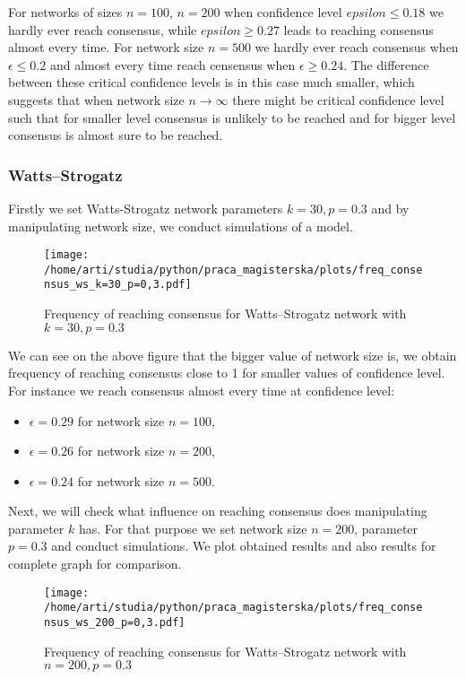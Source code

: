 \documentclass{article}
\begin{document}
For networks of sizes $n=100$, $n=200$ when confidence level $epsilon\leq0.18$ we hardly ever reach consensus, while $epsilon\geq0.27$ leads to reaching consensus almost every time.
For network size $n=500$ we hardly ever reach consensus when $\epsilon\leq0.2$ and almost every time reach censensus when $\epsilon\geq0.24$. The difference between these critical confidence levels is in this case much smaller, which suggests that when network size $n \to \infty$ there might be critical confidence level such that for smaller level consensus is unlikely to be reached and for bigger level consensus is almost sure to be reached. 

\subsubsection{Watts--Strogatz}

Firstly we set Watts-Strogatz network parameters $k=30, p=0.3$ and by manipulating network size, we conduct simulations of a model.

\begin{figure}[H]
		\centering
		\texttt{[image: /home/arti/studia/python/praca\_magisterska/plots/freq\_consensus\_ws\_k=30\_p=0,3.pdf]}
		\caption{Frequency of reaching consensus for Watts--Strogatz network with $k=30, p=0.3$}
\end{figure}

We can see on the above figure that the bigger value of network size is, we obtain frequency of reaching consensus close to 1 for smaller values of confidence level. For instance we reach consensus almost every time at confidence level:
\begin{itemize}
\item  $\epsilon=0.29$ for network size $n=100$,
\item  $\epsilon=0.26$ for network size $n=200$,
\item  $\epsilon=0.24$ for network size $n=500$.
\end{itemize}
\indent

Next, we will check what influence on reaching consensus does manipulating parameter $k$ has. For that purpose we set network size $n=200$, parameter $p=0.3$ and conduct simulations. We plot obtained results and also results for complete graph for comparison.

\begin{figure}[H]
		\centering
		\texttt{[image: /home/arti/studia/python/praca\_magisterska/plots/freq\_consensus\_ws\_200\_p=0,3.pdf]}
		\caption{Frequency of reaching consensus for Watts--Strogatz network with $n=200, p=0.3$}
\end{figure}
\end{document}
